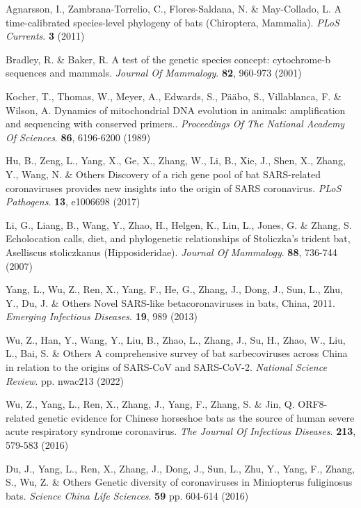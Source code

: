 \documentclass[9pt]{article}
\begin{document}
\begin{thebibliography}{999}
Agnarsson, I., Zambrana-Torrelio, C., Flores-Saldana, N. \& May-Collado, L. A time-calibrated species-level phylogeny of bats (Chiroptera, Mammalia). {\em PLoS Currents}. \textbf{3} (2011)

Bradley, R. \& Baker, R. A test of the genetic species concept: cytochrome-b sequences and mammals. {\em Journal Of Mammalogy}. \textbf{82}, 960-973 (2001)

Kocher, T., Thomas, W., Meyer, A., Edwards, S., Pääbo, S., Villablanca, F. \& Wilson, A. Dynamics of mitochondrial DNA evolution in animals: amplification and sequencing with conserved primers.. {\em Proceedings Of The National Academy Of Sciences}. \textbf{86}, 6196-6200 (1989)

Hu, B., Zeng, L., Yang, X., Ge, X., Zhang, W., Li, B., Xie, J., Shen, X., Zhang, Y., Wang, N. \& Others Discovery of a rich gene pool of bat SARS-related coronaviruses provides new insights into the origin of SARS coronavirus. {\em PLoS Pathogens}. \textbf{13}, e1006698 (2017)

Li, G., Liang, B., Wang, Y., Zhao, H., Helgen, K., Lin, L., Jones, G. \& Zhang, S. Echolocation calls, diet, and phylogenetic relationships of Stoliczka's trident bat, Aselliscus stoliczkanus (Hipposideridae). {\em Journal Of Mammalogy}. \textbf{88}, 736-744 (2007)

Yang, L., Wu, Z., Ren, X., Yang, F., He, G., Zhang, J., Dong, J., Sun, L., Zhu, Y., Du, J. \& Others Novel SARS-like betacoronaviruses in bats, China, 2011. {\em Emerging Infectious Diseases}. \textbf{19}, 989 (2013)

Wu, Z., Han, Y., Wang, Y., Liu, B., Zhao, L., Zhang, J., Su, H., Zhao, W., Liu, L., Bai, S. \& Others A comprehensive survey of bat sarbecoviruses across China in relation to the origins of SARS-CoV and SARS-CoV-2. {\em National Science Review}. pp. nwac213 (2022)

Wu, Z., Yang, L., Ren, X., Zhang, J., Yang, F., Zhang, S. \& Jin, Q. ORF8-related genetic evidence for Chinese horseshoe bats as the source of human severe acute respiratory syndrome coronavirus. {\em The Journal Of Infectious Diseases}. \textbf{213}, 579-583 (2016)

Du, J., Yang, L., Ren, X., Zhang, J., Dong, J., Sun, L., Zhu, Y., Yang, F., Zhang, S., Wu, Z. \& Others Genetic diversity of coronaviruses in Miniopterus fuliginosus bats. {\em Science China Life Sciences}. \textbf{59} pp. 604-614 (2016)


\end{thebibliography}
\end{document}
